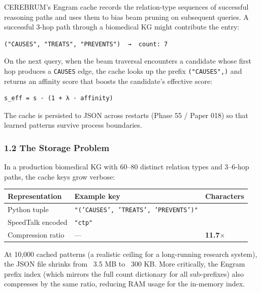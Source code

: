 CEREBRUM's Engram cache records the
relation-type sequences of successful reasoning paths and uses them to bias beam
pruning on subsequent queries.  A successful 3-hop path through a biomedical KG might
contribute the entry:

\begin{lstlisting}
("CAUSES", "TREATS", "PREVENTS")  →  count: 7
\end{lstlisting}

On the next query, when the beam traversal encounters a candidate whose first hop
produces a \texttt{CAUSES} edge, the cache looks up the prefix \texttt{("CAUSES",)} and returns
an affinity score that boosts the candidate's effective score:

\begin{lstlisting}
s_eff = s · (1 + λ · affinity)
\end{lstlisting}

The cache is persisted to JSON across restarts (Phase 55 / Paper 018) so that
learned patterns survive process boundaries.

\subsubsection{1.2 The Storage Problem}

In a production biomedical KG with 60–80 distinct relation types and 3–6-hop paths,
the cache keys grow verbose:

\begin{center}
{\footnotesize
\begin{tabularx}{\columnwidth}{|>{\raggedright\arraybackslash}X|>{\raggedright\arraybackslash}X|>{\raggedright\arraybackslash}X|}
\hline
Repres\-entation & Example key & Characters \\ \hline
Python tuple & \texttt{"('CAUSES', 'TREATS', 'PREVENTS')"} & 35 \\ \hline
SpeedTalk encoded & \texttt{"ctp"} & 3 \\ \hline
Compression ratio & — & \textbf{11.7$\times$} \\ \hline
\end{tabularx}
}
\end{center}

At 10,000 cached patterns (a realistic ceiling for a long-running research system),
the JSON file shrinks from ~3.5 MB to ~300 KB.  More critically, the Engram prefix
index (which mirrors the full count dictionary for all sub-prefixes) also compresses
by the same ratio, reducing RAM usage for the in-memory index.

